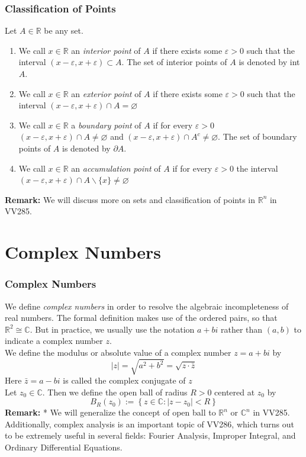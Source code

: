 \documentclass[10pt, t]{beamer}
\renewcommand{\emph}[1]{{\color{themecolor}\textsl{#1}}}
\newcommand{\R}{\mathbb{R}}
\newcommand{\nullspace}{~\\[15pt]}
\renewcommand{\emptyset}{\varnothing}
\begin{document}
\begin{frame}
    \frametitle{Classification of Points}
    Let $A\in \R$ be any set.
    \begin{enumerate}
        \item
              We call $x \in \mathbb{R}$ an \emph{interior point} of $A$ if there exists some $\varepsilon>0$ such that the interval $(x-\varepsilon, x+\varepsilon) \subset A .$ The set of interior points of $A$ is denoted by int $A$.
        \item
              We call $x \in \mathbb{R}$ an \emph{exterior point} of $A$ if there exists some $\varepsilon>0$ such that the interval $(x-\varepsilon, x+\varepsilon) \cap A=\emptyset$
        \item
              We call $x \in \mathbb{R}$ a \emph{boundary point} of $A$ if for every $\varepsilon>0$ $(x-\varepsilon, x+\varepsilon) \cap A \neq \emptyset$ and $(x-\varepsilon, x+\varepsilon) \cap A^{c} \neq \emptyset .$ The set of boundary points of $A$ is denoted by $\partial A$.
        \item
              We call $x \in \mathbb{R}$ an \emph{accumulation point} of $A$ if for every $\varepsilon>0$ the interval $(x-\varepsilon, x+\varepsilon) \cap A \backslash\{x\} \neq \emptyset$
    \end{enumerate}
    \textbf{Remark:} We will discuss more on sets and classification of points in $\R^n$ in VV285.

\end{frame}

\section{Complex Numbers}
\begin{frame}
    \frametitle{Complex Numbers}
    We define \emph{complex numbers} in order to resolve the algebraic incompleteness of real numbers. The formal definition makes use of the ordered pairs, so that $\R^2\cong\mathbb{C}$. But in practice, we usually use the notation $a+bi$ rather than $(a,b)$ to indicate a complex number $z$.\nullspace
    We define the modulus or absolute value of a complex number $z=a+b i$ by
    $$
        |z|=\sqrt{a^{2}+b^{2}}=\sqrt{z \cdot \bar{z}}
    $$
    Here $\bar{z}=a-b i$ is called the complex conjugate of $z$\nullspace
    Let $z_{0} \in \mathbb{C} .$ Then we define the open ball of radius $R>0$ centered at $z_{0}$ by
    $$
        B_{R}\left(z_{0}\right):=\left\{z \in \mathbb{C}:\left|z-z_{0}\right|<R\right\}
    $$
    \textbf{Remark:} * We will generalize the concept of open ball to $\R^n$ or $\mathbb{C}^n$ in VV285. Additionally, complex analysis is an important topic of VV286, which turns out to be extremely useful in several fields: Fourier Analysis, Improper Integral, and Ordinary Differential Equations.
\end{frame}
\end{document}
